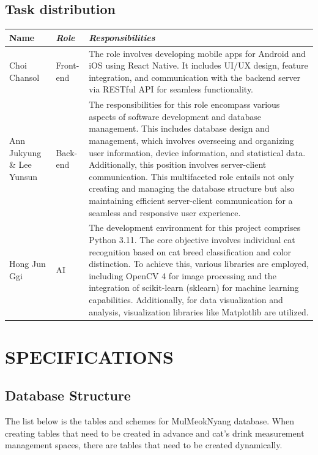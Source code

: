 \documentclass[conference]{IEEEtran}
\begin{document}
\subsection{Task distribution}
\begin{table}[!htbp]\normalsize
\begin{center}
\begin{tabular}{|p{1.2cm}|p{1.9cm}|p{4.5cm}|}
\hline
\textbf{Name} & \textbf{\textit{Role}}& \textbf{\textit{Responsibilities}}\\
\hline
Choi Chansol & Front-end &
The role involves developing mobile apps for Android and iOS using React Native. It includes UI/UX design, feature integration, and communication with the backend server via RESTful API for seamless functionality.
\\ \hline
Ann Jukyung \& Lee Yunsun & Back-end &
The responsibilities for this role encompass various aspects of software development and database management. This includes database design and management, which involves overseeing and organizing user information, device information, and statistical data. Additionally, this position involves server-client communication. This multifaceted role entails not only creating and managing the database structure but also maintaining efficient server-client communication for a seamless and responsive user experience.
\\ \hline
Hong Jun Ggi & AI &
The development environment for this project comprises Python 3.11. The core objective involves individual cat recognition based on cat breed classification and color distinction. To achieve this, various libraries are employed, including OpenCV 4 for image processing and the integration of scikit-learn (sklearn) for machine learning capabilities. Additionally, for data visualization and analysis, visualization libraries like Matplotlib are utilized.
\\ \hline
\end{tabular}
\label{tab2}
\end{center}
\end{table}

\section{SPECIFICATIONS}
\subsection{Database Structure}
The list below is the tables and schemes for MulMeokNyang database. When creating tables that need to be created in advance and cat's drink measurement management spaces, there are tables that need to be created dynamically.\\
\end{document}
